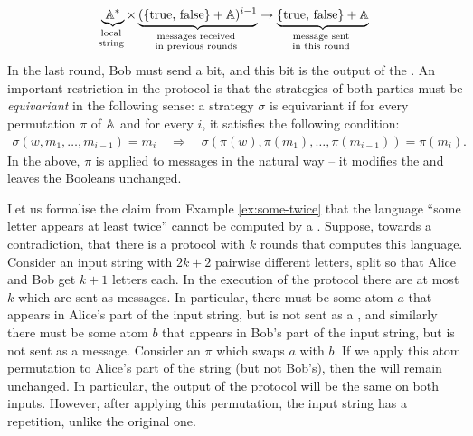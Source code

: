 \begin{align*}
\myunderbrace{\atoms^*}{local \\ string} \times \myunderbrace{(\set{\text{true, false}} + \atoms)^{i-1}}{messages received \\ in previous rounds} 
\to
\myunderbrace{\set{\text{true, false}} + \atoms}{message sent \\ in this round}
\end{align*}
In the last round, Bob must send a bit, and this bit is the output of the .
An important restriction in the protocol is that the strategies of both parties must be \emph{equivariant} in the following sense: 
a strategy $\sigma$ is equivariant if for every permutation $\pi$ of $\mathbb A$ and for every $i$, it satisfies the following condition:
\begin{align*}
\sigma(w, m_1, \ldots, m_{i-1}) = m_i 
\quad \Rightarrow \quad
\sigma(\pi(w), \pi(m_1), \ldots, \pi(m_{i-1})) = \pi(m_i).
\end{align*}
In the above, $\pi$ is applied to messages in the natural way -- 
it modifies the  and leaves the Booleans unchanged.

\begin{myexample}
    Let us formalise the claim from Example \ref{ex:some-twice} that the
    language ``some letter appears at least twice'' cannot be computed by a
    . 
    Suppose, towards a contradiction, that there is a protocol with
    $k$ rounds that computes this language. Consider an input string with
    $2k+2$ pairwise different letters, split so that Alice and Bob get $k+1$
    letters each. In the execution of the protocol there are at most $k$ 
    which are sent as messages. In particular, there must be some atom $a$ that
    appears in Alice's part of the input string, but is not sent as a ,
    and similarly there must be some atom $b$ that appears in Bob's part of the
    input string, but is not sent as a message. Consider an 
    $\pi$ which swaps $a$ with $b$. If we apply this atom permutation to
    Alice's part of the string (but not Bob's), then the 
    will remain unchanged. In particular, the output of the protocol will be
    the same on both inputs. However, after applying this permutation, the
    input string has a repetition, unlike the original one. 
\end{myexample}


